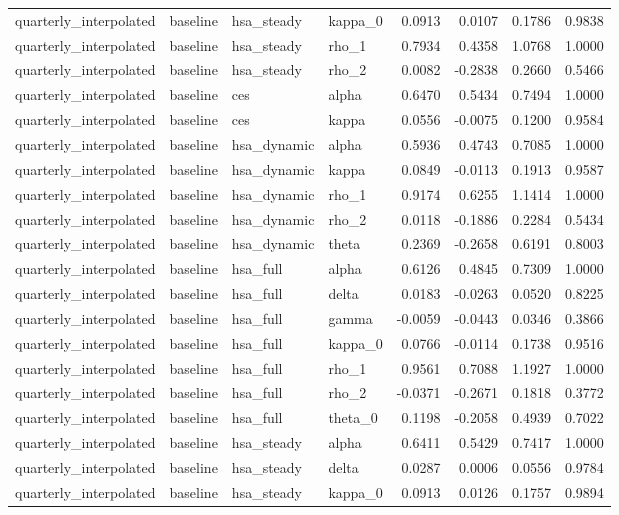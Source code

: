 \begin{tabular}{llllrrrr}
quarterly\_interpolated & baseline & hsa\_steady & kappa\_0 & 0.0913 & 0.0107 & 0.1786 & 0.9838 \\
quarterly\_interpolated & baseline & hsa\_steady & rho\_1 & 0.7934 & 0.4358 & 1.0768 & 1.0000 \\
quarterly\_interpolated & baseline & hsa\_steady & rho\_2 & 0.0082 & -0.2838 & 0.2660 & 0.5466 \\
quarterly\_interpolated & baseline & ces & alpha & 0.6470 & 0.5434 & 0.7494 & 1.0000 \\
quarterly\_interpolated & baseline & ces & kappa & 0.0556 & -0.0075 & 0.1200 & 0.9584 \\
quarterly\_interpolated & baseline & hsa\_dynamic & alpha & 0.5936 & 0.4743 & 0.7085 & 1.0000 \\
quarterly\_interpolated & baseline & hsa\_dynamic & kappa & 0.0849 & -0.0113 & 0.1913 & 0.9587 \\
quarterly\_interpolated & baseline & hsa\_dynamic & rho\_1 & 0.9174 & 0.6255 & 1.1414 & 1.0000 \\
quarterly\_interpolated & baseline & hsa\_dynamic & rho\_2 & 0.0118 & -0.1886 & 0.2284 & 0.5434 \\
quarterly\_interpolated & baseline & hsa\_dynamic & theta & 0.2369 & -0.2658 & 0.6191 & 0.8003 \\
quarterly\_interpolated & baseline & hsa\_full & alpha & 0.6126 & 0.4845 & 0.7309 & 1.0000 \\
quarterly\_interpolated & baseline & hsa\_full & delta & 0.0183 & -0.0263 & 0.0520 & 0.8225 \\
quarterly\_interpolated & baseline & hsa\_full & gamma & -0.0059 & -0.0443 & 0.0346 & 0.3866 \\
quarterly\_interpolated & baseline & hsa\_full & kappa\_0 & 0.0766 & -0.0114 & 0.1738 & 0.9516 \\
quarterly\_interpolated & baseline & hsa\_full & rho\_1 & 0.9561 & 0.7088 & 1.1927 & 1.0000 \\
quarterly\_interpolated & baseline & hsa\_full & rho\_2 & -0.0371 & -0.2671 & 0.1818 & 0.3772 \\
quarterly\_interpolated & baseline & hsa\_full & theta\_0 & 0.1198 & -0.2058 & 0.4939 & 0.7022 \\
quarterly\_interpolated & baseline & hsa\_steady & alpha & 0.6411 & 0.5429 & 0.7417 & 1.0000 \\
quarterly\_interpolated & baseline & hsa\_steady & delta & 0.0287 & 0.0006 & 0.0556 & 0.9784 \\
quarterly\_interpolated & baseline & hsa\_steady & kappa\_0 & 0.0913 & 0.0126 & 0.1757 & 0.9894 \\

\end{tabular}
